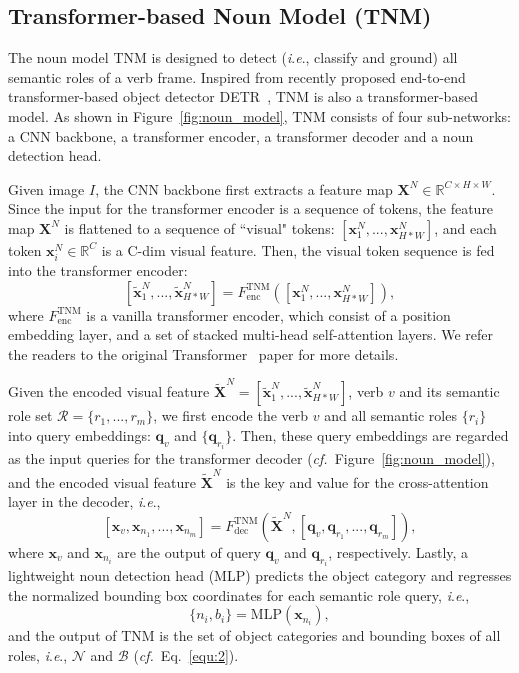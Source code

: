 \documentclass[letterpaper]{article} %
\newcommand{\ie}{\textit{i}.\textit{e}.}
\newcommand{\cf}{\textit{cf.}}
\begin{document}
\subsection{Transformer-based Noun Model (TNM)}

The noun model TNM is designed to detect (\ie, classify and ground) all semantic roles of a verb frame. Inspired from recently proposed end-to-end transformer-based object detector DETR~\cite{carion2020end}, TNM is also a transformer-based model. As shown in Figure~\ref{fig:noun_model}, TNM consists of four sub-networks: a CNN backbone, a transformer encoder, a transformer decoder and a noun detection head.

Given image $I$, the CNN backbone first extracts a feature map $\bm{X}^N \in\mathbb{R}^{C \times {H} \times {W}}$. Since the input for the transformer encoder is a sequence of tokens, the feature map $\bm{X}^N$ is flattened to a sequence of ``visual" tokens: $[\bm{x}^N_1, ..., \bm{x}^N_{H*W}]$, and each token $\bm{x}^N_i \in \mathbb{R}^C$ is a C-dim visual feature. Then, the visual token sequence is fed into the transformer encoder:
\begin{equation}
    \left[ \tilde{\bm{x}}^N_1, ..., \tilde{\bm{x}}^N_{H*W} \right] = F^{\text{TNM}}_{\text{enc}} (\left[\bm{x}^N_1, ..., \bm{x}^N_{H*W} \right]),
\end{equation}
where $F^{\text{TNM}}_{\text{enc}}$ is a vanilla transformer encoder, which consist of a position embedding layer, and a set of stacked multi-head self-attention layers. We refer the readers to the original Transformer~\cite{vaswani2017attention} paper for more details.


Given the encoded visual feature $\tilde{\bm{X}}^N = [\tilde{\bm{x}}^N_1, ..., \tilde{\bm{x}}^N_{H*W} ]$, verb $v$ and its semantic role set $\mathcal{R}=\{r_1,...,r_m\}$, we first encode the verb $v$ and all semantic roles $\{r_i\}$ into query embeddings: $\bm{q}_v$ and $\{\bm{q}_{r_i}\}$. Then, these query embeddings are regarded as the input queries for the transformer decoder (\cf~Figure~\ref{fig:noun_model}), and the encoded visual feature $\tilde{\bm{X}}^N$ is the key and value for the cross-attention layer in the decoder, \ie,
\begin{equation} \label{equ:4}
    [\bm{x}_v, \bm{x}_{n_1}, ..., \bm{x}_{n_m}] = F^{\text{TNM}}_{\text{dec}} (\tilde{\bm{X}}^N, [\bm{q}_v, \bm{q}_{r_1}, ..., \bm{q}_{r_m}]),
\end{equation}
where $\bm{x}_v$ and $\bm{x}_{n_i}$ are the output of query $\bm{q}_v$ and $\bm{q}_{r_i}$, respectively. Lastly, a lightweight noun detection head (MLP) predicts the object category and regresses the normalized bounding box coordinates for each semantic role query, \ie,
\begin{equation}
    \{n_i, b_i\} = \text{MLP}(\bm{x}_{n_i}),
\end{equation}
and the output of TNM is the set of object categories and bounding boxes of all roles, \ie, $\mathcal{N}$ and $\mathcal{B}$ (\cf~Eq.~\eqref{equ:2}).
\end{document}
